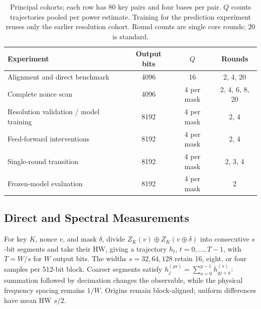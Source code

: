 \documentclass[electronics,article,submit,pdftex,oneauthor]{Definitions/mdpi}
\begin{document}
\begin{table}[t]
\caption{Principal cohorts; each row has 80 key pairs and four bases per pair. $Q$ counts trajectories pooled per power estimate. Training for the prediction experiment reuses only the earlier resolution cohort. Round counts are single core rounds; 20 is standard.\label{tab:cohorts}}
\small\setlength{\tabcolsep}{4pt}
\begin{tabularx}{\textwidth}{Xccc}
\toprule
\textbf{Experiment} & \textbf{Output bits} & \textbf{$Q$} & \textbf{Rounds}\\
\midrule
Alignment and direct benchmark & 4096 & 16 & 2, 4, 20\\
Complete nonce scan & 4096 & 4 per mask & 2, 4, 6, 8, 20\\
Resolution validation / model training & 8192 & 4 per mask & 2, 4\\
Feed-forward interventions & 8192 & 4 per mask & 2, 4\\
Single-round transition & 8192 & 4 per mask & 2, 3, 4\\
Frozen-model evaluation & 8192 & 4 per mask & 2\\
\bottomrule
\end{tabularx}
\end{table}

\subsection{Direct and Spectral Measurements}\label{sec:spectral}

For key $K$, nonce $v$, and mask $\delta$, divide $Z_K(v)\oplus Z_K(v\oplus\delta)$ into consecutive $s$-bit segments and take their HW, giving a trajectory $h_t$, $t=0,\ldots,T-1$, with $T=W/s$ for $W$ output bits. The widths $s=32,64,128$ retain 16, eight, or four samples per 512-bit block. Coarser segments satisfy $h^{(gs)}_j=\sum_{a=0}^{g-1}h^{(s)}_{gj+a}$: summation followed by decimation changes the observable, while the physical frequency spacing remains $1/W$. Origins remain block-aligned; uniform differences have mean HW $s/2$.
\end{document}
